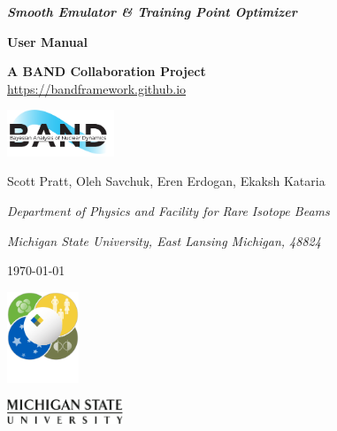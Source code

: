 \documentclass[12pt]{article}
\numberwithin{equation}{section}
\numberwithin{figure}{section}
\begin{document}
\begin{titlepage}
   \begin{center}
       \vspace*{1.5cm}

       {\bf\LARGE {\it Smooth Emulator \&  Training Point Optimizer}}\\
       \vspace*{8pt}

       {\bf\Large User Manual}

       {\bf A BAND Collaboration Project}\\
       \href{https://bandframework.github.io}{https://bandframework.github.io}
       
       \begin{center}
     
       \includegraphics[width=0.24\textwidth]{figs/BAND_logo.png}
      \end{center}
      


       \vspace{0.25cm}

       {\large Scott Pratt, Oleh Savchuk, Eren Erdogan, Ekaksh Kataria}

       {\it Department of Physics and Facility for Rare Isotope Beams}

       {\it Michigan State University, East Lansing Michigan, 48824}

       \today
  \end{center}
       
    \vspace*{3.0cm}
     

     \hspace*{2.0cm}
      \includegraphics[width=0.16\textwidth]{figs/FRIB_logo.png}

       \vspace*{-3cm}
       \hspace*{6.35cm}
       \includegraphics[width=0.26\textwidth]{figs/msu_logo}


\end{titlepage}
\end{document}
